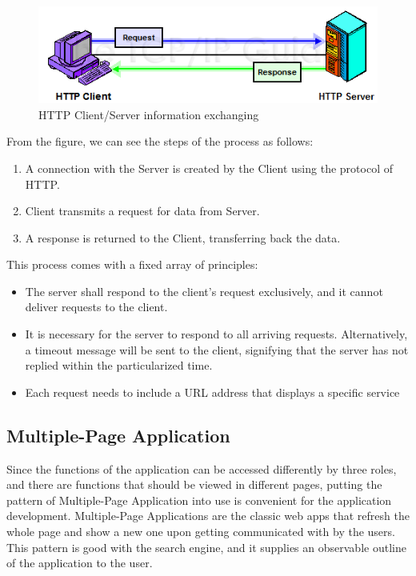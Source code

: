 \documentclass[a4paper, 11pt,openany]{book} %
\begin{document}
\begin{figure}[H]
    \centering
    \includegraphics{images/httpclientserver.png}
    \caption{HTTP Client/Server information exchanging}
    \label{fig:protocalExample}
\end{figure}
From the figure, we can see the steps of the process as follows:
\begin{enumerate}
    \item A connection with the Server is created by the Client using the protocol of HTTP.
    \item Client transmits a request for data from Server.
    \item A response is returned to the Client, transferring back the data.
\end{enumerate}
This process comes with a fixed array of principles:
\begin{itemize}
    \item The server shall respond to the client's request exclusively, and it cannot deliver requests to the client. 
    \item It is necessary for the server to respond to all arriving requests. Alternatively, a timeout message will be sent to the client, signifying that the server has not replied within the particularized time.
    \item Each request needs to include a URL address that displays a specific service 
\end{itemize}
\subsection{Multiple-Page Application}
Since the functions of the application can be accessed differently by three roles, and there are functions that should be viewed in different pages, putting the pattern of Multiple-Page Application into use is convenient for the application development. Multiple-Page Applications are the classic web apps that refresh the whole page and show a new one upon getting communicated with by the users. This pattern is good with the search engine, and it supplies an observable outline of the application to the user.\cite{mpa}
\end{document}
